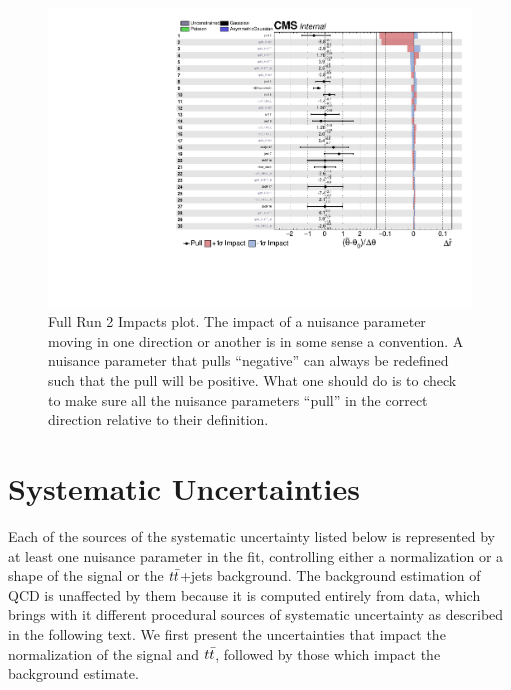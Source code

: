\begin{figure}[!htb]
	\centering
	\includegraphics[width=1\textwidth]{Figures/impacts.pdf}
	\caption{Full Run 2 Impacts plot. The impact of a nuisance parameter moving in one direction or another is in some sense a convention. 
	A nuisance parameter that pulls ``negative'' can always be redefined such that the pull will be positive. What one should do is to check to make sure all the nuisance parameters ``pull'' in the correct direction relative to their definition.}
	\label{fig:Impactsplot}
\end{figure}
\clearpage

\section{Systematic Uncertainties\label{sec:Systematics}}

Each of the sources of the systematic uncertainty listed below is represented by at least one nuisance parameter in the fit, controlling either a normalization or a shape of the signal or the $t\bar{t} $+jets background. The background estimation of QCD is unaffected by them because it is computed entirely from data, which brings with it different procedural sources of systematic uncertainty as described in the following text. We first present the uncertainties that impact the normalization of the signal and $t\bar{t} $, followed by those which impact the background estimate.

